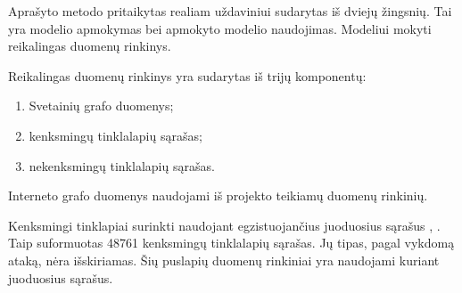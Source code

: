 Aprašyto metodo pritaikytas realiam uždaviniui sudarytas iš dviejų žingsnių. Tai yra modelio apmokymas bei apmokyto modelio naudojimas. Modeliui mokyti reikalingas duomenų rinkinys.


Reikalingas duomenų rinkinys yra sudarytas iš trijų komponentų:
\begin{enumerate}
    \item Svetainių grafo duomenys;
    \item kenksmingų tinklalapių sąrašas;
    \item nekenksmingų tinklalapių sąrašas.
\end{enumerate}
Interneto grafo duomenys naudojami iš \cite{webgraph} projekto teikiamų duomenų rinkinių.

Kenksmingi tinklapiai surinkti naudojant egzistuojančius juoduosius sąrašus \cite{mal1}, \cite{mal2} \cite{mal3} \cite{mal4}. Taip suformuotas 48761 kenksmingų tinklalapių sąrašas. Jų tipas, pagal vykdomą ataką, nėra išskiriamas. Šių puslapių duomenų rinkiniai yra naudojami kuriant juoduosius sąrašus.